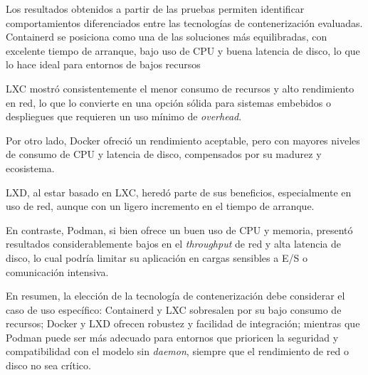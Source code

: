 Los resultados obtenidos a partir de las pruebas permiten identificar comportamientos diferenciados entre las tecnologías de contenerización evaluadas. Containerd se posiciona como una de las soluciones más equilibradas, con excelente tiempo de arranque, bajo uso de CPU y buena latencia de disco, lo que lo hace ideal para entornos de bajos recursos

LXC mostró consistentemente el menor consumo de recursos y alto rendimiento en red, lo que lo convierte en una opción sólida para sistemas embebidos o despliegues que requieren un uso mínimo de \textit{overhead}. 

Por otro lado, Docker ofreció un rendimiento aceptable, pero con mayores niveles de consumo de CPU y latencia de disco, compensados por su madurez y ecosistema. 

LXD, al estar basado en LXC, heredó parte de sus beneficios, especialmente en uso de red, aunque con un ligero incremento en el tiempo de arranque. 

En contraste, Podman, si bien ofrece un buen uso de CPU y memoria, presentó resultados considerablemente bajos en el \textit{throughput} de red y alta latencia de disco, lo cual podría limitar su aplicación en cargas sensibles a E/S o comunicación intensiva.

\vspace{0.5em}

\noindent En resumen, la elección de la tecnología de contenerización debe considerar el caso de uso específico: Containerd y LXC sobresalen por su bajo consumo de recursos; Docker y LXD ofrecen robustez y facilidad de integración; mientras que Podman puede ser más adecuado para entornos que prioricen la seguridad y compatibilidad con el modelo sin \textit{daemon}, siempre que el rendimiento de red o disco no sea crítico.

